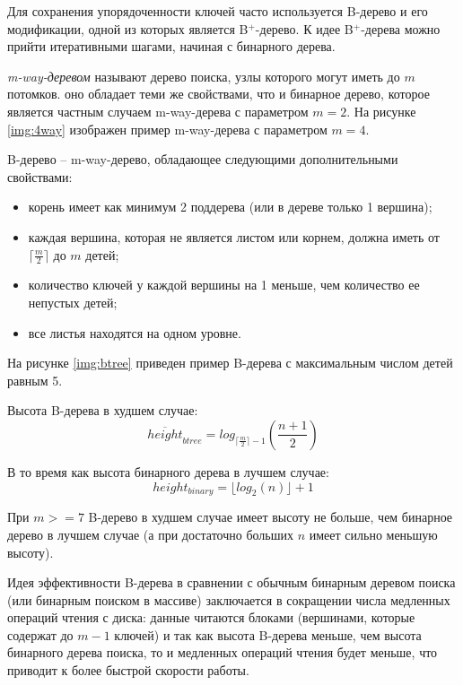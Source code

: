 Для сохранения упорядоченности ключей часто используется B-дерево и его модификации, одной из которых является B$^+$-дерево. К идее B$^+$-дерева можно прийти итеративными шагами, начиная с бинарного дерева.

\textit{m-way-деревом} называют дерево поиска, узлы которого могут иметь до $m$ потомков\cite{mway}. оно обладает теми же свойствами, что и бинарное дерево, которое является частным случаем m-way-дерева с параметром $m = 2$. На рисунке \ref{img:4way} изображен пример m-way-дерева с параметром $m = 4$.


B-дерево -- m-way-дерево, обладающее следующими дополнительными свойствами:
\begin{itemize}
    \item корень имеет как минимум 2 поддерева (или в дереве только 1 вершина);
    \item каждая вершина, которая не является листом или корнем, должна иметь от $\lceil\frac{m}{2}\rceil$ до $m$ детей;
    \item количество ключей у каждой вершины на 1 меньше, чем количество ее непустых детей;
    \item все листья находятся на одном уровне.
\end{itemize}

На рисунке \ref{img:btree} приведен пример B-дерева с максимальным числом детей равным 5.



Высота B-дерева в худшем случае\cite{hbtree}:
\begin{equation}
    \overline{height}_{btree} = log_{\lceil\frac{m}{2}\rceil - 1}\left(\frac{n + 1}{2}\right)
\end{equation}

В то время как высота бинарного дерева в лучшем случае:
\begin{equation}
    height_{binary} = \lfloor log_2(n) \rfloor + 1
\end{equation}

При $m >= 7$ B-дерево в худшем случае имеет высоту не больше, чем бинарное дерево в лучшем случае (а при достаточно больших $n$ имеет сильно меньшую высоту).

Идея эффективности B-дерева в сравнении с обычным бинарным деревом поиска (или бинарным поиском в массиве) заключается в сокращении числа медленных операций чтения с диска: данные читаются блоками (вершинами, которые содержат до $m-1$ ключей) и так как высота B-дерева меньше, чем высота бинарного дерева поиска, то и медленных операций чтения будет меньше, что приводит к более быстрой скорости работы.

